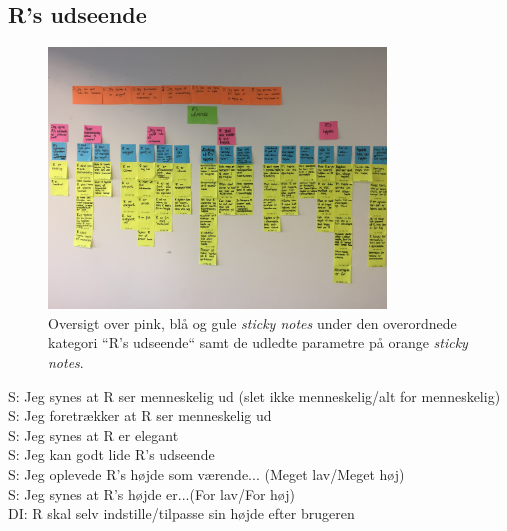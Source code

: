 \subsection{R's udseende}
%
\begin{figure}[H]
\centering
\includegraphics[width = 0.8\textwidth]{Figure/AffinityDiagram/RsUdseende} 
\caption{Oversigt over pink, blå og gule \textit{sticky notes} under den overordnede kategori ``R's udseende`` samt de udledte parametre på orange \textit{sticky notes}.}
\label{fig:AFRsUdseende}
\end{figure}
\noindent
%
S: Jeg synes at R ser menneskelig ud (slet ikke menneskelig/alt for menneskelig)\\
S: Jeg foretrækker at R ser menneskelig ud\\
S: Jeg synes at R er elegant\\
S: Jeg kan godt lide R's udseende\\
S: Jeg oplevede R's højde som værende... (Meget lav/Meget høj)\\
S: Jeg synes at R's højde er...(For lav/For høj)\\
DI: R skal selv indstille/tilpasse sin højde efter brugeren\\

